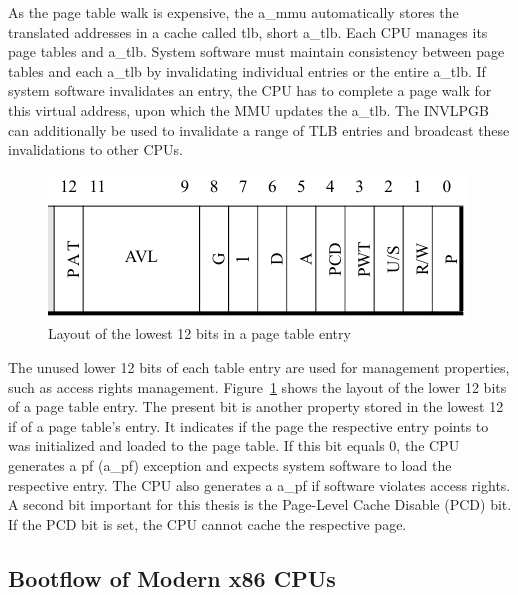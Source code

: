 As the page table walk is expensive, the \acrshort{a_mmu} automatically stores
the translated addresses in a cache called \gls{tlb}, short \acrshort{a_tlb}.
Each CPU manages its page tables and \acrshort{a_tlb}. System software must
maintain consistency between page tables and each \acrshort{a_tlb} by
invalidating individual entries or the entire \acrshort{a_tlb}. If system
software invalidates an entry, the CPU has to complete a page walk for this
virtual address, upon which the MMU updates the \acrshort{a_tlb}. The INVLPGB
can additionally be used to invalidate a range of TLB entries and broadcast
these invalidations to other CPUs. \\

\begin{figure}
    \begin{center}
        \includegraphics[width=.6\textwidth]{images/paging_rights_placeholder.png}
        \caption{Layout of the lowest 12 bits in a page table entry}
        \label{fig:state:technical:paging_rights}
    \end{center}
\end{figure}

The unused lower 12 bits of each table entry are used for management properties,
such as access rights management. Figure~\ref{fig:state:technical:paging_rights}
shows the layout of the lower 12 bits of a page table entry. The present bit is
another property stored in the lowest 12 if of a page table's entry. It
indicates if the page the respective entry points to was initialized and loaded
to the page table. If this bit equals 0, the CPU generates a \gls{pf}
(\acrshort{a_pf}) exception and expects system software to load the respective
entry. The CPU also generates a \acrshort{a_pf} if software violates access
rights. A second bit important for this thesis is the Page-Level Cache Disable
(PCD) bit. If the PCD bit is set, the CPU cannot cache the respective page.

\subsection{Bootflow of Modern x86 CPUs}
\label{sec:state:technical:boot}
